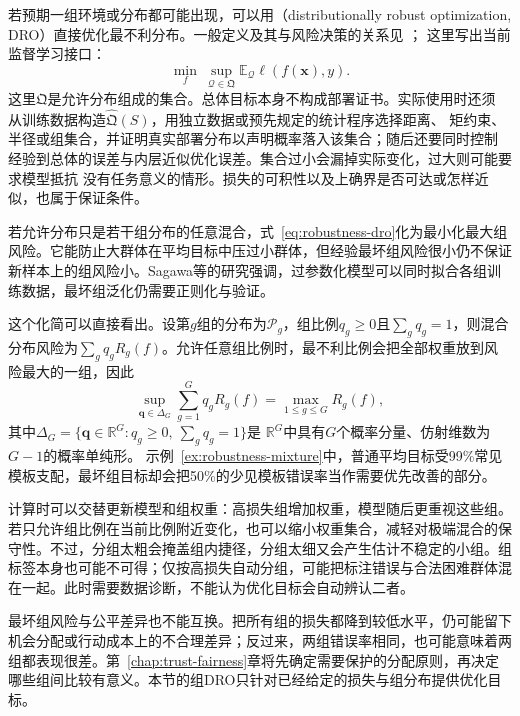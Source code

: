 若预期一组环境或分布都可能出现，可以用（distributionally robust optimization, DRO）直接优化最不利分布。一般定义及其与风险决策的关系见
；
这里写出当前监督学习接口：
\begin{equation}
 \min_f\ \sup_{\mathcal Q\in\mathfrak Q}
   \mathbb E_{\mathcal Q}\ell(f(\bm{x}),y).
 \label{eq:robustness-dro}
\end{equation}
这里$\mathfrak Q$是允许分布组成的集合。总体目标本身不构成部署证书。实际使用时还须
从训练数据构造$\widehat{\mathfrak Q}(S)$，用独立数据或预先规定的统计程序选择距离、
矩约束、半径或组集合，并证明真实部署分布以声明概率落入该集合；随后还要同时控制
经验到总体的误差与内层近似优化误差。集合过小会漏掉实际变化，过大则可能要求模型抵抗
没有任务意义的情形。损失的可积性以及上确界是否可达或怎样近似，也属于保证条件。

若允许分布只是若干组分布的任意混合，式~\eqref{eq:robustness-dro}化为最小化最大组风险。它能防止大群体在平均目标中压过小群体，但经验最坏组风险很小仍不保证新样本上的组风险小。Sagawa等的研究强调，过参数化模型可以同时拟合各组训练数据，最坏组泛化仍需要正则化与验证。

这个化简可以直接看出。设第$g$组的分布为$\mathcal P_g$，组比例$q_g\geq0$且$\sum_gq_g=1$，则混合分布风险为$\sum_gq_gR_g(f)$。允许任意组比例时，最不利比例会把全部权重放到风险最大的一组，因此
\begin{equation}
 \sup_{\bm{q}\in\Delta_G}\sum_{g=1}^{G}q_gR_g(f)
       =\max_{1\leq g\leq G}R_g(f),
 \label{eq:robustness-group-dro}
\end{equation}
其中$\Delta_G=\{\bm q\in\mathbb R^G:q_g\geq0,\ \sum_gq_g=1\}$是
$\mathbb R^G$中具有$G$个概率分量、仿射维数为$G-1$的概率单纯形。
示例~\ref{ex:robustness-mixture}中，普通平均目标受99\%常见模板支配，最坏组目标却会把50\%的少见模板错误率当作需要优先改善的部分。

计算时可以交替更新模型和组权重：高损失组增加权重，模型随后更重视这些组。若只允许组比例在当前比例附近变化，也可以缩小权重集合，减轻对极端混合的保守性。不过，分组太粗会掩盖组内捷径，分组太细又会产生估计不稳定的小组。组标签本身也可能不可得；仅按高损失自动分组，可能把标注错误与合法困难群体混在一起。此时需要数据诊断，不能认为优化目标会自动辨认二者。

最坏组风险与公平差异也不能互换。把所有组的损失都降到较低水平，仍可能留下机会分配或行动成本上的不合理差异；反过来，两组错误率相同，也可能意味着两组都表现很差。第~\ref{chap:trust-fairness}章将先确定需要保护的分配原则，再决定哪些组间比较有意义。本节的组DRO只针对已经给定的损失与组分布提供优化目标。

